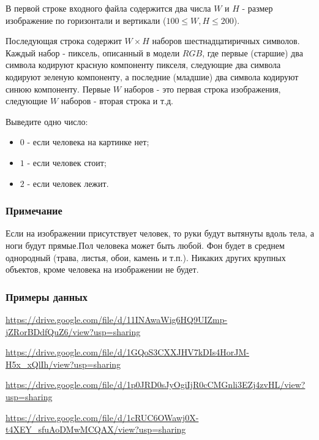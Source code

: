 
В первой строке входного файла содержится два числа $W$ и $H$ - размер изображение по горизонтали и вертикали ($100 \le W, H \le 200$).

Последующая строка содержит $W \times H$ наборов шестнадцатиричных символов. Каждый набор - пиксель, описанный в модели $RGB$, где первые (старшие) два символа кодируют красную компоненту пикселя, следующие два символа кодируют зеленую компоненту, а последние (младшие) два символа кодируют синюю компоненту. Первые $W$ наборов - это первая строка изображения, следующие $W$ наборов - вторая строка и т.д.

\outputfmtSection

Выведите одно число:

\begin{itemize}
    \item $0$ - если человека на картинке нет;
    \item $1$ - если человек стоит;
    \item $2$ - если человек лежит.
\end{itemize}

\subsubsection*{Примечание}

Если на изображении присутствует человек, то руки будут вытянуты вдоль тела, а ноги будут прямые.Пол человека может быть любой. Фон будет в среднем однородный (трава, листья, обои, камень и т.п.). Никаких других крупных объектов, кроме человека на изображении не будет.

\subsubsection*{Примеры данных}

    
    \url{https://drive.google.com/file/d/11INAwaWig6HQ9UIZmp-jZRorBDdfQuZ6/view?usp=sharing}
    
     \url{https://drive.google.com/file/d/1GQoS3CXXJHV7kDIs4HorJM-H5x_xQlIh/view?usp=sharing}
    
     \url{https://drive.google.com/file/d/1p0JRD0sJyOgiIjR0cCMGnli3EZj4zvHL/view?usp=sharing}
    
     \url{https://drive.google.com/file/d/1cRUC6OWawj0X-t4XEY_sfuAoDMwMCQAX/view?usp=sharing}

